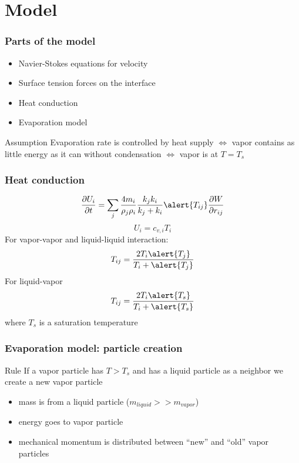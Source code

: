 \section[Model]{Model}
\begin{frame}
  \frametitle{Parts of the model}
  \begin{itemize}
  \item Navier-Stokes equations for velocity
  \item Surface tension forces on the interface~\footnotemark
  \item \alert{Heat conduction~\footnotemark[2]}
  \item \alert{Evaporation model}
  \end{itemize}
  \begin{block}{Assumption}
    Evaporation rate is controlled by heat supply
    $\Longleftrightarrow$ vapor contains as little energy as it can
    without condensation $\Longleftrightarrow$ vapor is at $T=T_s$
  \end{block}

\end{frame}

\begin{frame}
  \frametitle{Heat conduction}
  \begin{equation}
    \label{eq:heatConductionTerm}
    \frac{\partial U_i}{\partial t} = \sum_j\frac{4 m_i}{\rho_j \rho_i} \frac{k_j k_i}{k_j + k_i} \alert{T_{ij}} \frac{\partial W}{\partial r_{ij}}
  \end{equation}
  \begin{equation}
    \label{eq:ideal}
    U_i = c_{v,i} T_i
  \end{equation}
  For vapor-vapor and liquid-liquid interaction:
  \begin{equation}
    \label{eq:tij}
    T_{ij} = \frac{2T_i \alert{T_j}}{T_i + \alert{T_j}}
  \end{equation}
  For liquid-vapor
  \begin{equation}
    \label{eq:tab}
    T_{ij} = \frac{2T_i \alert{T_s}}{T_i + \alert{T_s}}
  \end{equation}
  where $T_s$ is a saturation temperature
\end{frame}

\begin{frame}
  \frametitle{Evaporation model: particle creation}
  \begin{block}{Rule}
    If a vapor particle has $T>T_s$ and has a liquid particle as a
    neighbor we create a new vapor particle
  \end{block}
  \begin{itemize}
  \item mass is from a liquid particle ($m_{liquid} >> m_{vapor}$)
  \item energy goes to vapor particle
  \item mechanical momentum is distributed between ``new'' and ``old''
    vapor particles
  \end{itemize}
\end{frame}

